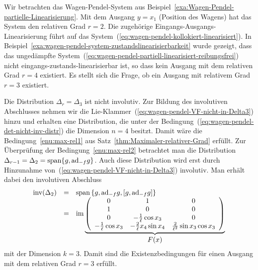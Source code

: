 \begin{example}
\label{exa:Wagen-Pendel-max-rel-grad}Wir betrachten das Wagen-Pendel-System
aus Beispiel~\ref{exa:Wagen-Pendel-partielle-Linearisierung}. Mit
dem Ausgang $y=x_{1}$ (Position des Wagens) hat das System den relativen
Grad $r=2$. Die zugehörige Eingangs-Ausgangs-Linearisierung führt
auf das System~(\ref{eq:wagen-pendel-kollokiert-linearisiert}).
In Beispiel~\ref{exa:wagen-pendel-system-zustandslinearisierbarkeit}
wurde gezeigt, dass das ungedämpfte System~(\ref{eq:wagen-pendel-partiell-linearisiert-reibungsfrei})
nicht eingangs-zustands-linearisierbar ist, so dass kein Ausgang mit
dem relativen Grad $r=4$ existiert. Es stellt sich die Frage, ob
ein Ausgang mit relativem Grad $r=3$ existiert.

Die Distribution $\Delta_{r}=\Delta_{3}$ ist nicht involutiv. Zur
Bildung des involutiven Abschlusses nehmen wir die Lie-Klammer~(\ref{eq:wagen-pendel-VF-nicht-in-Delta3})
hinzu und erhalten eine Distribution, die unter der Bedingung~(\ref{eq:wagen-pendel-det-nicht-inv-distr})
die Dimension $n=4$ besitzt. Damit wäre die Bedingung~\ref{enu:max-rel1}
aus Satz~\ref{thm:Maximaler-relativer-Grad} erfüllt. Zur Überprüfung
der Bedingung~\ref{enu:max-rel2} betrachtet man die Distribution
$\Delta_{r-1}=\Delta_{2}={\operatorname{span}}\{g,{\operatorname{ad}}_{-f}g\}$. Auch diese Distribution
wird erst durch Hinzunahme von~(\ref{eq:wagen-pendel-VF-nicht-in-Delta3})
involutiv. Man erhält dabei den involutiven Abschluss
\begin{equation}
\begin{array}{ccl}
{\operatorname{inv}}(\Delta_{2}) & = & {\operatorname{span}}\left\{ g,{\operatorname{ad}}_{-f}g,[g,{\operatorname{ad}}_{-f}g]\right\} \\
 & = & {\operatorname{im}}\underbrace{\left(\begin{array}{ccc}
0 & 1 & 0\\
1 & 0 & 0\\
0 & -\frac{1}{\ell}\cos x_{3} & 0\\
-\frac{1}{\ell}\cos x_{3} & -\frac{2}{\ell}x_{4}\sin x_{4} & \frac{2}{\ell^{2}}\sin x_{3}\cos x_{3}
\end{array}\right)}_{{\displaystyle F(x)}}
\end{array}\label{eq:wagen-pendel-involutive-distr}
\end{equation}
mit der Dimension $k=3$. Damit sind die Existenzbedingungen für einen
Ausgang mit dem relativen Grad $r=3$ erfüllt. 


\end{example}
